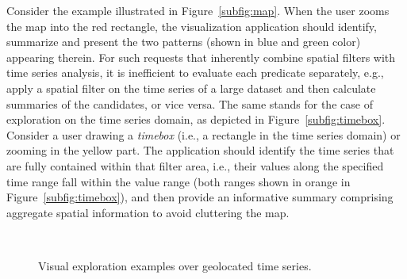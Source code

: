 Consider the example illustrated in Figure~\ref{subfig:map}. When the user zooms the map into the red rectangle, the visualization application should identify, summarize and present the two patterns (shown in blue and green color) appearing therein. For such requests that inherently combine spatial filters with time series analysis, it is inefficient to evaluate each predicate separately, e.g., apply a spatial filter on the time series of a large dataset and then calculate summaries of the candidates, or vice versa. The same stands for the case of exploration on the time series domain, as depicted in Figure~\ref{subfig:timebox}. Consider a user drawing a {\em timebox} (i.e., a rectangle in the time series domain) or zooming in the yellow part. The application should identify the time series that are fully contained within that filter area, i.e., their values along the specified time range fall within the value range (both ranges shown in orange in Figure~\ref{subfig:timebox}), and then provide an informative summary comprising aggregate spatial information to avoid cluttering the map.

\begin{figure}[!t]
 \centering
 \
\caption{Visual exploration examples over geolocated time series.}
\label{fig:examples}
\end{figure}

